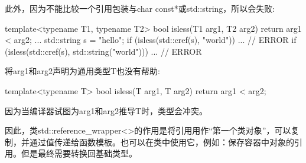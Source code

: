 此外，因为不能比较一个引用包装与char const*或std::string，所以会失败:

\begin{cpp}
template<typename T1, typename T2>
bool isless(T1 arg1, T2 arg2)
{
	return arg1 < arg2;
}
...
std::string s = "hello";
if (isless(std::cref(s), "world")) ... // ERROR
if (isless(std::cref(s), std::string("world"))) ... // ERROR
\end{cpp}

将arg1和arg2声明为通用类型T也没有帮助:

\begin{cpp}
template<typename T>
bool isless(T arg1, T arg2)
{
	return arg1 < arg2;
}
\end{cpp}

因为当编译器试图为arg1和arg2推导T时，类型会冲突。

因此，类std::reference\_wrapper<>的作用是将引用用作“第一个类对象”，可以复制，并通过值传递给函数模板。也可以在类中使用它，例如：保存容器中对象的引用。但是最终需要转换回基础类型。











